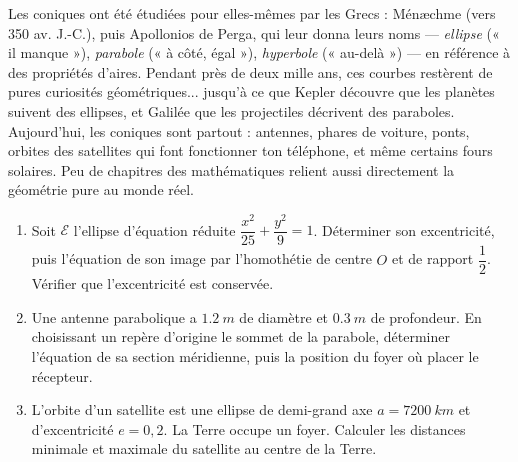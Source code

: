 \documentclass[11pt]{article}
\begin{document}
\begin{savaistu}
Les coniques ont été étudiées pour elles-mêmes par les Grecs : Ménæchme (vers 350 av. J.-C.), puis Apollonios de Perga, qui leur donna leurs noms — \emph{ellipse} (« il manque »), \emph{parabole} (« à côté, égal »), \emph{hyperbole} (« au-delà ») — en référence à des propriétés d'aires. Pendant près de deux mille ans, ces courbes restèrent de pures curiosités géométriques... jusqu'à ce que Kepler découvre que les planètes suivent des ellipses, et Galilée que les projectiles décrivent des paraboles. Aujourd'hui, les coniques sont partout : antennes, phares de voiture, ponts, orbites des satellites qui font fonctionner ton téléphone, et même certains fours solaires. Peu de chapitres des mathématiques relient aussi directement la géométrie pure au monde réel.
\end{savaistu}

\begin{exercice}
\begin{enumerate}
\item Soit $\mathcal{E}$ l'ellipse d'équation réduite $\dfrac{x^2}{25} + \dfrac{y^2}{9} = 1$. Déterminer son excentricité, puis l'équation de son image par l'homothétie de centre $O$ et de rapport $\dfrac{1}{2}$. Vérifier que l'excentricité est conservée.
\item Une antenne parabolique a $\SI{1,2}{m}$ de diamètre et $\SI{0,3}{m}$ de profondeur. En choisissant un repère d'origine le sommet de la parabole, déterminer l'équation de sa section méridienne, puis la position du foyer où placer le récepteur.
\item L'orbite d'un satellite est une ellipse de demi-grand axe $a = \SI{7200}{km}$ et d'excentricité $e = 0{,}2$. La Terre occupe un foyer. Calculer les distances minimale et maximale du satellite au centre de la Terre.
\end{enumerate}
\end{exercice}
\end{document}
